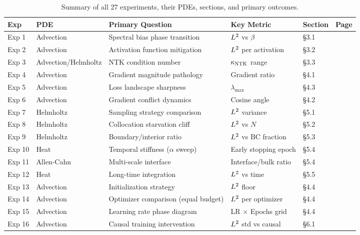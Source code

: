 \begin{table}[htbp]
\centering
\small
\caption{Summary of all 27 experiments, their PDEs, sections, and primary outcomes.}
\label{tab:experiments_summary}
\begin{tabular}{@{}llp{6.0cm}p{3.2cm}ll@{}}
\toprule
Exp & PDE & Primary Question & Key Metric & Section & Page \\
\midrule
Exp 1 & Advection & Spectral bias phase transition & $L^2$ vs $\beta$ & \S 3.1 & \pageref{sec:exp1} \\
Exp 2 & Advection & Activation function mitigation & $L^2$ per activation & \S 3.2 & \pageref{sec:exp2} \\
Exp 3 & Advection/Helmholtz & NTK condition number & $\kappa_{\mathrm{NTK}}$ range & \S 3.3 & \pageref{sec:exp3} \\
Exp 4 & Advection & Gradient magnitude pathology & Gradient ratio & \S 4.1 & \pageref{sec:exp4} \\
Exp 5 & Advection & Loss landscape sharpness & $\lambda_{\max}$ & \S 4.3 & \pageref{sec:exp5} \\
Exp 6 & Advection & Gradient conflict dynamics & Cosine angle & \S 4.2 & \pageref{sec:exp6} \\
Exp 7 & Helmholtz & Sampling strategy comparison & $L^2$ variance & \S 5.1 & \pageref{sec:exp7} \\
Exp 8 & Helmholtz & Collocation starvation cliff & $L^2$ vs $N$ & \S 5.2 & \pageref{sec:exp8} \\
Exp 9 & Helmholtz & Boundary/interior ratio & $L^2$ vs BC fraction & \S 5.3 & \pageref{sec:exp9} \\
Exp 10 & Heat & Temporal stiffness ($\alpha$ sweep) & Early stopping epoch & \S 5.4 & \pageref{sec:exp10} \\
Exp 11 & Allen-Cahn & Multi-scale interface & Interface/bulk ratio & \S 5.4 & \pageref{sec:exp11} \\
Exp 12 & Heat & Long-time integration & $L^2$ vs time & \S 5.5 & \pageref{sec:exp12} \\
Exp 13 & Advection & Initialization strategy & $L^2$ floor & \S 4.4 & \pageref{sec:exp13} \\
Exp 14 & Advection & Optimizer comparison (equal budget) & $L^2$ per optimizer & \S 4.4 & \pageref{sec:exp14} \\
Exp 15 & Advection & Learning rate phase diagram & LR $\times$ Epochs grid & \S 4.4 & \pageref{sec:exp15} \\
Exp 16 & Advection & Causal training intervention & $L^2$ std vs causal & \S 6.1 & \pageref{sec:exp16} \\

\end{tabular}
\end{table}
